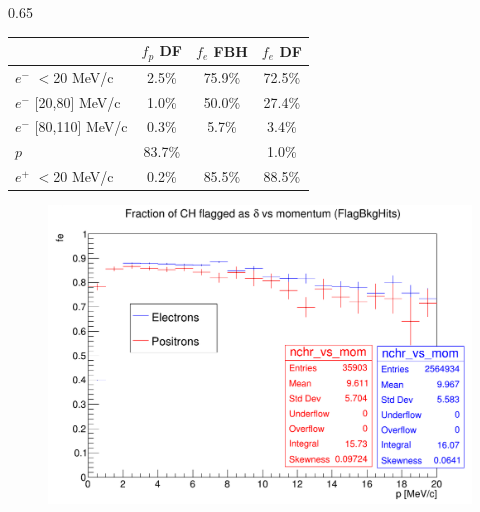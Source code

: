 \documentclass{beamer}
\begin{document}
\begin{frame}
\begin{columns}
\begin{column}{0.65\framewidth}
\begin{table}[h!]
        \end{table}
        \vspace{-6mm}
        \begin{table}[h!]
    \centering
            \hspace*{-0.5em}
    \renewcommand{\arraystretch}{0.7}
    \begin{tabular}{| l | c | c | c |} 
    \hline
    &    {\scriptsize $f_{p}$ DF} & {\scriptsize $f_{e}$ FBH } & {\scriptsize $f_{e}$ DF} \\
    \hline
    {\scriptsize $e^-$} {\tiny$<$20 MeV/c}      & {\scriptsize 2.5\%}   & {\scriptsize 75.9\%} & {\scriptsize 72.5\%}\\
    \hline
    {\scriptsize $e^-$} {\tiny[20,80] MeV/c}  & {\scriptsize 1.0\%}   & {\scriptsize 50.0\%} & {\scriptsize 27.4\%} \\
    \hline
    {\scriptsize $e^-$} {\tiny[80,110] MeV/c}  & {\scriptsize 0.3\%}  &  {\scriptsize 5.7\%} & {\scriptsize 3.4\%}\\
    \hline
    {\scriptsize $p$}       &         {\scriptsize 83.7\%}   &  & {\scriptsize 1.0\%}\\
    \hline
    {\scriptsize $e^+$} {\tiny$<$20 MeV/c} & {\scriptsize 0.2\%}    &   {\scriptsize 85.5\%}& {\scriptsize 88.5\%}\\
    \hline

    \end{tabular}
    
    \end{table}
   
    \begin{figure}[!h]
        \centering
        \hspace*{-2.1em}
        \includegraphics[width =0.8\columnwidth]{figures/png/Screenshot_20240818_155835.png}
       \label{fig:0pbarbefore}
\end{figure}

 
   
       
\end{column}
\end{columns}

       
   
   
\end{frame}
\end{document}
